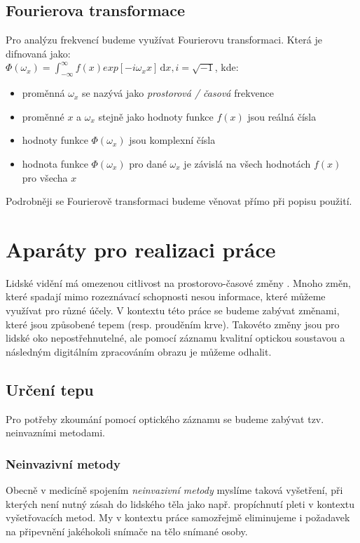 \documentclass[
  digital, %
  table,   %
%
  lof,     %
  lot,     %
]{fithesis3}
\begin{document}
\section{Fourierova transformace}
    Pro analýzu frekvencí budeme využívat Fourierovu transformaci. Která je difnovaná jako: \\
    $\Phi(\omega_x)= \int_{-\infty}^{\infty} \! f(x)exp[-i\omega_xx]\, \mathrm{d}x, i =\sqrt{-1}$, kde: \\
    \begin{itemize}
    	\item proměnná $\omega_x$ se nazývá jako \emph{prostorová / časová} frekvence \\
	    \item proměnné $x$ a $\omega_x$ stejně jako hodnoty funkce $f(x)$ jsou reálná čísla \\
		\item hodnoty funkce $\Phi(\omega_x)$ jsou komplexní čísla \\
	    \item hodnota funkce $\Phi(\omega_x)$ pro dané $\omega_x$ je závislá na všech hodnotách $f(x)$ pro všecha $x$\\
	\end{itemize}
    Podrobněji se Fourierově transformaci budeme věnovat přímo při popisu použití.


\chapter{Aparáty pro realizaci práce}
Lidské vidění má omezenou citlivost na prostorovo-časové změny \cite{eulerian-magnification}.
Mnoho změn, které spadají mimo rozeznávací schopnosti nesou informace, které můžeme využívat pro různé účely. V kontextu této práce se budeme zabývat změnami, které jsou způsobené tepem (resp. prouděním krve). Takovéto změny jsou pro lidské oko nepostřehnutelné, ale pomocí záznamu kvalitní optickou soustavou a následným digitálním zpracováním obrazu je můžeme odhalit.

\section{Určení tepu}
Pro potřeby zkoumání pomocí optického záznamu se budeme zabývat tzv. neinvazními metodami.

\subsection{Neinvazivní metody}
Obecně v medicíně spojením \emph{neinvazivní metody} myslíme taková vyšetření, při kterých není nutný zásah do lidského těla jako např. propíchnutí pleti v kontextu vyšetřovacích metod. My v kontextu práce samozřejmě eliminujeme i požadavek na připevnění jakéhokoli snímače na tělo snímané osoby.
\end{document}
